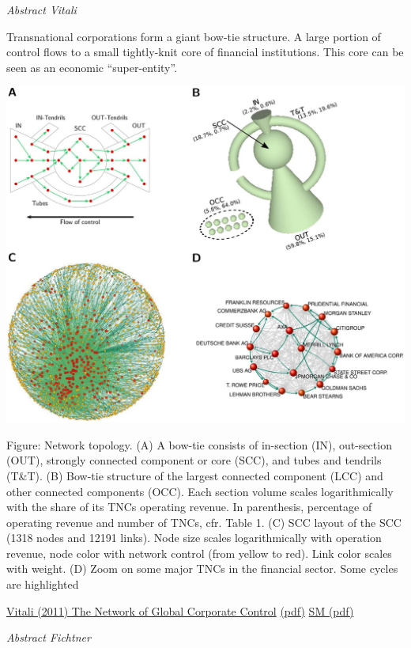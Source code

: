 \documentclass[
]{book}
\begin{document}
\emph{Abstract Vitali}

Transnational corporations form a giant bow-tie structure.
A large portion of control flows to a small tightly-knit core of financial institutions.
This core can be seen as an economic ``super-entity''.

\includegraphics{fig/Vitali_2D.png}

Figure: Network topology. (A) A bow-tie consists of in-section (IN), out-section (OUT), strongly connected component or core (SCC), and tubes
and tendrils (T\&T). (B) Bow-tie structure of the largest connected component (LCC) and other connected components (OCC). Each section volume
scales logarithmically with the share of its TNCs operating revenue. In parenthesis, percentage of operating revenue and number of TNCs, cfr. Table 1.
(C) SCC layout of the SCC (1318 nodes and 12191 links). Node size scales logarithmically with operation revenue, node color with network control
(from yellow to red). Link color scales with weight. (D) Zoom on some major TNCs in the financial sector. Some cycles are highlighted

\href{https://journals.plos.org/plosone/article?id=10.1371/journal.pone.0025995}{Vitali (2011) The Network of Global Corporate Control}
\href{pdf/Vitali_2011_Network_Global_Control.pdf}{(pdf)}
\href{pdf/Vitali_2011_Network_Global_Control_SM.pdf}{SM (pdf)}

\emph{Abstract Fichtner}
\end{document}

